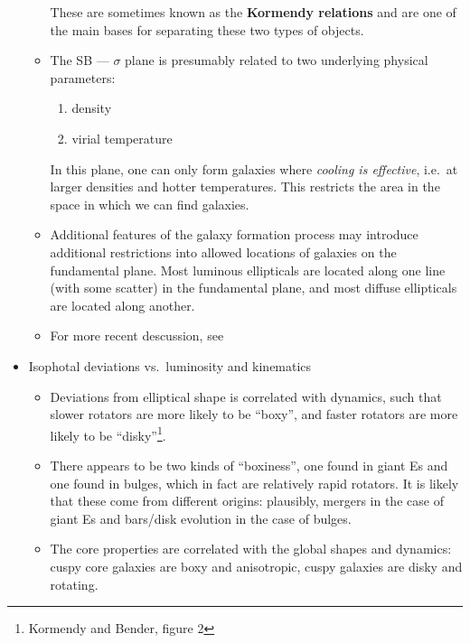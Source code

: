 \documentclass{article}
\begin{document}
\begin{itemize}
\begin{itemize}
                These are sometimes known as the \textbf{Kormendy
                relations} and are one of the main bases for separating
                these two types of objects.
            \item The SB --- $\sigma$ plane is presumably related to
                two underlying physical parameters:
                \begin{enumerate}
                    \item density
                    \item virial temperature
                \end{enumerate}
                In this plane, one can only form galaxies where
                \emph{cooling is effective}, i.e.\ at larger densities and
                hotter temperatures. This restricts the area in the space
                in which we can find galaxies.
            \item Additional features of the galaxy formation process may
                introduce additional restrictions into allowed locations of
                galaxies on the fundamental plane. Most luminous
                ellipticals are located along one line (with some scatter)
                in the fundamental plane, and most diffuse ellipticals are
                located along another.
            \item For more recent descussion, see
        \end{itemize}
    \item Isophotal deviations vs.\ luminosity and kinematics
        \begin{itemize}
            \item Deviations from elliptical shape is correlated with
                dynamics, such that slower rotators are more likely to be
                ``boxy'', and faster rotators are more likely to be
                ``disky''\footnote{Kormendy and Bender, figure 2}.
            \item There appears to be two kinds of ``boxiness'', one found
                in giant Es and one found in bulges, which in fact are
                relatively rapid rotators.  It is likely that these come
                from different origins: plausibly, mergers in the case of
                giant Es and bars/disk evolution in the case of bulges.
            \item The core properties are correlated with the global shapes
                and dynamics: cuspy core galaxies are boxy and anisotropic,
                cuspy galaxies are disky and rotating.

\end{itemize}
\end{itemize}
\end{document}
